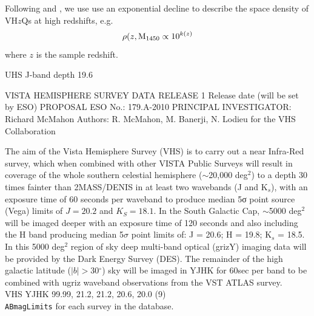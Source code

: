 \documentclass[usenatbib]{mnras}
\begin{document}
Following \citet{Fan2001b} and \citet{McGreer2013}, we use use an
exponential decline to describe the space density of VH$z$Qs at high
redshifts, e.g.
\begin{equation}
\rho(z, {\rm M}_{1450} \propto 10^{k (z)}
\end{equation}
where $z$ is the sample redshift. 

UHS J-band depth 19.6 \citep[Vega; ][]{Dye2018}

VISTA HEMISPHERE SURVEY DATA RELEASE 1
Release date (will be set by ESO)
PROPOSAL ESO No.: 179.A-2010
PRINCIPAL INVESTIGATOR: Richard McMahon
Authors: R. McMahon, M. Banerji, N. Lodieu for the VHS Collaboration

The aim of the Vista Hemisphere Survey (VHS) is to carry out a near
Infra-Red survey, which when combined with other VISTA Public Surveys
will result in coverage of the whole southern celestial hemisphere
($\sim$20,000 deg$^2$) to a depth 30 times fainter than 2MASS/DENIS in
at least two wavebands (J and K$_s$), with an exposure time of 60 seconds
per waveband to produce median 5σ point source (Vega) limits of $J =
20.2$ and $K_{S} = 18.1$. In the South Galactic Cap, $\sim$5000 deg$^{2}$ will be
imaged deeper with an exposure time of 120 seconds and also including
the H band producing median 5$\sigma$ point limits of: J = 20.6; H = 19.8; K$_{s}$ = 18.5. 
In this 5000 deg$^{2}$ region of sky deep multi-band optical (grizY)
imaging data will be provided by the Dark Energy Survey (DES). The
remainder of the high galactic latitude ($|b|>$30$^{\circ}$) sky will be imaged
in YJHK for 60sec per band to be combined with ugriz waveband
observations from the VST ATLAS survey. \\ 

VHS                   YJHK            99.99, 21.2,  21.2,  20.6,  20.0                (9) \\

{\tt ABmagLimits} for each survey in the database. \\



\end{document}
